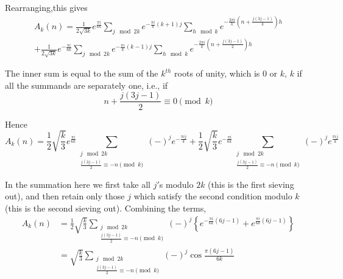 Rearranging,\pageoriginale this gives
\begin{multline*}
  A_k(n) = \frac{1}{2\sqrt{3k}} e^{\frac{\pi i}{6k}} \sum_{j \mod 2k}
  e^{- \frac{\pi i}{k} (k+1) j} \sum_{h \mod k} e^{-\frac{2
    \pi i}{k}( n+  \frac{j(3j-1)}{k})h} \\
  + \frac{1}{2 \sqrt{3k}} e^{- \frac{\pi i}{6k}} \sum_{j \mod 2k}
  e^{- \frac{\pi i}{k} (k-1)j} \sum_{h \mod k}  e^{- \frac{2
    \pi i}{k} (n+ \frac{j(3j-1)}{2})h}
\end{multline*}

The inner sum is equal to the sum of the $k^{th}$ roots of unity,
which is 0 or $k$, $k$ if all the summands are separately one, i.e.,
if 
$$
n+ \frac{j(3j-1)}{2} \equiv 0 \pmod{k}
$$

Hence 
$$
A_k (n) = \frac{1}{2} \sqrt{\frac{k}{3}} e^{\frac{\pi i}{6k}}
\sum_{\substack{j \mod 2k\\ \frac{j(3j-1)}{2} \equiv -n \pmod{k}}}
(-)^j e^{- \frac{\pi ij}{k}}+ \frac{1}{2} \sqrt{\frac{k}{3}}
e^{-\frac{\pi i}{6k}} \sum_{\substack{j \mod 2k\\ \frac{j(3j-1)}{2}
    \equiv -n \pmod{k}}} (-)^j e^{\frac{\pi i j}{k}}
$$

In the summation here we first take all $j'$s modulo $2k$ (this is the
first sieving out), and then retain only those $j$ which satisfy the
second condition modulo $k$ (this is the second sieving
out). Combining the terms,
\begin{align*}
  A_k (n) & = \frac{1}{2} \sqrt{\frac{k}{3}} \sum_{\substack{j \mod
      2k\\\frac{j(3j-1)}{2} \equiv -n \pmod{k}}} (-)^j \left\{ e^{-
    \frac{\pi i}{6k} (6j-1)} + e^{\frac{\pi i}{6k} (6j-1)}\right\}\\
  & = \sqrt{\frac{k}{3}} \sum_{\substack{j \mod
      2k\\\frac{j(3j-1)}{2} \equiv -n \pmod{k}}} (-)^j \cos \frac{\pi
    (6j-1)}{6k} 
\end{align*}\pageoriginale

